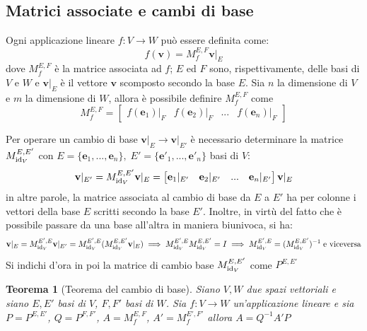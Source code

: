 \documentclass{article}
\newtheorem{theorem}{Teorema}
\begin{document}
\vspace{10pt}
\subsection{Matrici associate e cambi di base} \label{subsec:linappmat}
    Ogni applicazione lineare $f: V \rightarrow W$ può essere definita come:
    \[
        f(\mathbf{v}) = M_{f}^{E, F}\mathbf{v}\rvert_{E}
    \]
    dove $M_{f}^{E, F}$ è la matrice associata ad $f$; $E$ ed $F$ sono, rispettivamente, delle basi di $V$ e $W$ e $\mathbf{v}\rvert_{E}$ è il vettore $\mathbf{v}$ scomposto secondo la base $E$.
    Sia $n$ la dimensione di $V$ e $m$ la dimensione di $W$, allora è possibile definire $M_{f}^{E, F}$ come
    \[
        M_{f}^{E, F} = \begin{bmatrix} f(\mathbf{e}_{1})\rvert_{F} & f(\mathbf{e}_{2})\rvert_{F} & ... & f(\mathbf{e}_{n})\rvert_{F} \end{bmatrix}
    \]

    \vspace{10pt}
    Per operare un cambio di base $\mathbf{v}\rvert_{E} \rightarrow \mathbf{v}\rvert_{E'}$ è necessario determinare la matrice $M_{\textnormal{id}_V}^{E, E'}$ con $E = \{\mathbf{e}_{1}, ..., \mathbf{e}_{n}\}, \; E' = \{\mathbf{e'}_{1}, ..., \mathbf{e'}_{n}\}$ basi di $V$:  
    \[
        \mathbf{v}\rvert_{E'} = M_{\textnormal{id}_V}^{E, E'} \mathbf{v}\rvert_{E} = \begin{bmatrix} \mathbf{e}_{1}\rvert_{E'} & \mathbf{e}_{2}\rvert_{E'} & ... & \mathbf{e}_{n}\rvert_{E'} \end{bmatrix} \mathbf{v}\rvert_{E}
    \]
    in altre parole, la matrice associata al cambio di base da $E$ a $E'$ ha per colonne i vettori della base $E$ scritti secondo la base $E'$.
    Inoltre, in virtù del fatto che è possibile passare da una base all'altra in maniera biunivoca, si ha:
    \[
        \mathbf{v}\rvert_{E} = 
        M_{\textnormal{id}_V}^{E', E} \mathbf{v}\rvert_{E'} = 
        M_{\textnormal{id}_V}^{E', E} (M_{\textnormal{id}_V}^{E, E'} \mathbf{v}\rvert_{E}) \implies 
        M_{\textnormal{id}_V}^{E', E} M_{\textnormal{id}_V}^{E, E'} = I \implies 
        M_{\textnormal{id}_V}^{E', E} = (M_{\textnormal{id}_V}^{E, E'})^{-1} \; \textnormal{e viceversa}
    \]
    Si indichi d'ora in poi la matrice di cambio base $M_{\textnormal{id}_V}^{E, E'}$ come $P^{E, E'}$

    \vspace{10pt}
    \begin{theorem}[Teorema del cambio di base]
        Siano $V, W$ due spazi vettoriali e siano $E, E'$ basi di $V$, $F, F'$ basi di $W$. Sia $f : V \rightarrow W$ un'applicazione lineare e sia 
        $P = P^{E, E'}$, $Q = P^{F, F'}$, $A = M_{f}^{E, F}$, $A' = M_{f}^{E', F'}$ allora $A = Q^{-1} A' P$
    \end{theorem}
\end{document}
